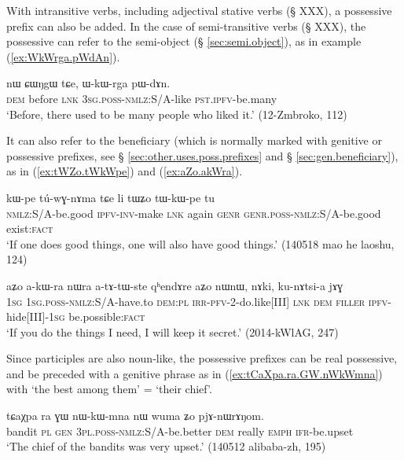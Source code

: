 With intransitive verbs, including adjectival stative verbs (§ XXX), a possessive prefix can also be added. In the case of semi-transitive verbs (§ XXX), the possessive can refer to the semi-object (§ \ref{sec:semi.object}), as in example (\ref{ex:WkWrga.pWdAn}).

 \begin{exe} 
\ex \label{ex:WkWrga.pWdAn}
\gll  nɯ ɕɯŋgɯ tɕe, ɯ-kɯ-rga pɯ-dɤn. \\
\textsc{dem} before \textsc{lnk} \textsc{3sg}.\textsc{poss}-\textsc{nmlz}:S/A-like \textsc{pst}.\textsc{ipfv}-be.many \\
\glt  `Before, there used to be many people who liked it.' (12-Zmbroko, 112)
\end{exe}

It can also refer to the beneficiary (which is normally marked with genitive or possessive prefixes, see § \ref{sec:other.uses.poss.prefixes} and § \ref{sec:gen.beneficiary}), as in (\ref{ex:tWZo.tWkWpe}) and (\ref{ex:aZo.akWra}).

 \begin{exe} 
\ex \label{ex:tWZo.tWkWpe}
\gll  kɯ-pe tú-wɣ-nɤma tɕe li tɯʑo tɯ-kɯ-pe tu \\
\textsc{nmlz}:S/A-be.good \textsc{ipfv}-\textsc{inv}-make \textsc{lnk} again \textsc{genr} \textsc{genr}.\textsc{poss}-\textsc{nmlz}:S/A-be.good exist:\textsc{fact} \\
\glt  `If one does good things, one will also have good things.' (140518 mao he laoshu, 124)
\end{exe}

 \begin{exe} 
\ex \label{ex:aZo.akWra}
\gll  aʑo a-kɯ-ra nɯra a-tɤ-tɯ-ste qʰendɤre aʑo nɯnɯ, nɤki, ku-nɤtsi-a jɤɣ \\
\textsc{1sg} \textsc{1sg}.\textsc{poss}-\textsc{nmlz}:S/A-have.to \textsc{dem}:\textsc{pl} \textsc{irr}-\textsc{pfv}-2-do.like[III] \textsc{lnk} \textsc{dem} \textsc{filler} \textsc{ipfv}-hide[III]-\textsc{1sg} be.possible:\textsc{fact}  \\
\glt  `If you do the things I need, I will keep it secret.'  (2014-kWlAG, 247)
\end{exe}

Since participles are also noun-like, the possessive prefixes can be real possessive, and be preceded with a genitive phrase as in (\ref{ex:tCaXpa.ra.GW.nWkWmna}) with  `the best among them' = `their chief'.

 \begin{exe} 
\ex \label{ex:tCaXpa.ra.GW.nWkWmna}
\gll tɕaχpa ra ɣɯ nɯ-kɯ-mna nɯ wuma ʑo pjɤ-nɯrɤŋom. \\
bandit \textsc{pl} \textsc{gen} \textsc{3pl}.\textsc{poss}-\textsc{nmlz}:S/A-be.better \textsc{dem} really \textsc{emph} \textsc{ifr}-be.upset \\
\glt `The chief of the bandits was very upset.' (140512 alibaba-zh, 195)
\end{exe}

